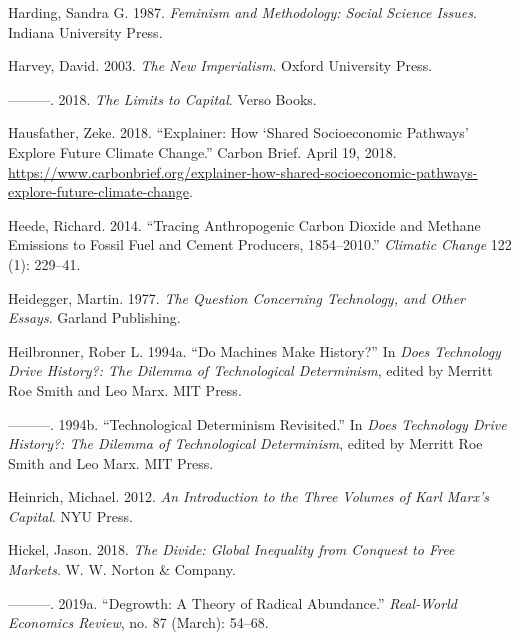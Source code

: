 \documentclass[a4paper, nobind]{templates/ociamthesis}
\newlength{\cslhangindent}
\newenvironment{CSLReferences}[2] %
 {%
  \setlength{\parindent}{0pt}
  \ifodd #1
  \let\oldpar\par
  \def\par{\hangindent=\cslhangindent\oldpar}
  \fi
  \setlength{\parskip}{1mm}
  \setlength{\baselineskip}{6mm}
 }%
 {}
\begin{document}
\begin{CSLReferences}{1}{0}
\leavevmode{}%
Harding, Sandra G. 1987. \emph{Feminism and Methodology: {Social} Science Issues}. {Indiana University Press}.

\leavevmode{}%
Harvey, David. 2003. \emph{The {New Imperialism}}. {Oxford University Press}.

\leavevmode{}%
---------. 2018. \emph{The {Limits} to {Capital}}. {Verso Books}.

\leavevmode{}%
Hausfather, Zeke. 2018. {``Explainer: {How} {`{Shared Socioeconomic Pathways}'} Explore Future Climate Change.''} {Carbon Brief}. April 19, 2018. \url{https://www.carbonbrief.org/explainer-how-shared-socioeconomic-pathways-explore-future-climate-change}.

\leavevmode{}%
Heede, Richard. 2014. {``Tracing Anthropogenic Carbon Dioxide and Methane Emissions to Fossil Fuel and Cement Producers, 1854--2010.''} \emph{Climatic Change} 122 (1): 229--41.

\leavevmode{}%
Heidegger, Martin. 1977. \emph{The {Question Concerning Technology}, and {Other Essays}}. {Garland Publishing}.

\leavevmode{}%
Heilbronner, Rober L. 1994a. {``Do {Machines Make History}?''} In \emph{Does {Technology Drive History}?: {The Dilemma} of {Technological Determinism}}, edited by Merritt Roe Smith and Leo Marx. {MIT Press}.

\leavevmode{}%
---------. 1994b. {``Technological {Determinism Revisited}.''} In \emph{Does {Technology Drive History}?: {The Dilemma} of {Technological Determinism}}, edited by Merritt Roe Smith and Leo Marx. {MIT Press}.

\leavevmode{}%
Heinrich, Michael. 2012. \emph{An {Introduction} to the {Three Volumes} of {Karl Marx}'s {Capital}}. {NYU Press}.

\leavevmode{}%
Hickel, Jason. 2018. \emph{The {Divide}: {Global Inequality} from {Conquest} to {Free Markets}}. {W. W. Norton \& Company}.

\leavevmode{}%
---------. 2019a. {``Degrowth: A Theory of Radical Abundance.''} \emph{Real-World Economics Review}, no. 87 (March): 54--68.


\end{CSLReferences}
\end{document}
